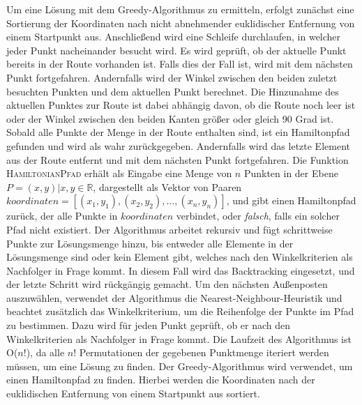 \documentclass[a4paper,10pt,ngerman]{scrartcl}
\begin{document}
    \newline\newline
    Um eine Lösung mit dem Greedy-Algorithmus zu ermitteln,
    erfolgt zunächst eine Sortierung der Koordinaten nach nicht abnehmender euklidischer Entfernung von einem Startpunkt aus.
    Anschließend wird eine Schleife durchlaufen, in welcher jeder Punkt nacheinander besucht wird.
    Es wird geprüft, ob der aktuelle Punkt bereits in der Route vorhanden ist.
    Falls dies der Fall ist, wird mit dem nächsten Punkt fortgefahren.
    Andernfalls wird der Winkel zwischen den beiden zuletzt besuchten Punkten und dem aktuellen Punkt berechnet.
    Die Hinzunahme des aktuellen Punktes zur Route ist dabei abhängig davon, ob die Route noch leer ist oder der Winkel zwischen den beiden Kanten größer oder gleich 90 Grad ist.
    Sobald alle Punkte der Menge in der Route enthalten sind, ist ein Hamiltonpfad gefunden und wird als wahr zurückgegeben.
    Andernfalls wird das letzte Element aus der Route entfernt und mit dem nächsten Punkt fortgefahren.
    \newline\newline
    Die Funktion \textsc{HamiltonianPfad} erhält als Eingabe eine Menge von $n$ Punkten in der Ebene $P={(x,y)| x,y \in \mathbb{R}}$,
    dargestellt als Vektor von Paaren $\textit{koordinaten}=[(x_1,y_1), (x_2,y_2),\dots, (x_n,y_n)]$, und gibt einen Hamiltonpfad zurück,
    der alle Punkte in $\textit{koordinaten}$ verbindet, oder \textit{falsch}, falls ein solcher Pfad nicht existiert.
    Der Algorithmus arbeitet rekursiv und fügt schrittweise Punkte zur Lösungsmenge hinzu, bis entweder alle Elemente in der Lösungsmenge sind oder kein Element gibt,
    welches nach den Winkelkriterien als Nachfolger in Frage kommt.
    In diesem Fall wird das Backtracking eingesetzt, und der letzte Schritt wird rückgängig gemacht.
    Um den nächsten Außenposten auszuwählen, verwendet der Algorithmus die Nearest-Neighbour-Heuristik und beachtet zusätzlich das Winkelkriterium,
    um die Reihenfolge der Punkte im Pfad zu bestimmen.
    Dazu wird für jeden Punkt geprüft, ob er nach den Winkelkriterien als Nachfolger in Frage kommt.
    Die Laufzeit des Algorithmus ist O($n!$), da alle $n!$ Permutationen der gegebenen Punktmenge iteriert werden müssen, um eine Lösung zu finden.
    \newline\newline
    Der Greedy-Algorithmus wird verwendet, um einen Hamiltonpfad zu finden.
    Hierbei werden die Koordinaten nach der euklidischen Entfernung von einem Startpunkt aus sortiert.
\end{document}

